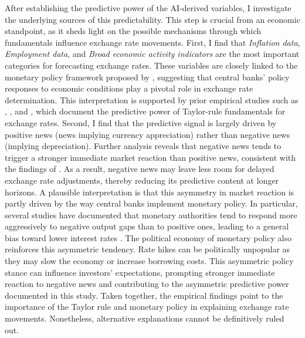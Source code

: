 \documentclass[12pt,oneside,letter]{article}
\begin{document}
	After establishing the predictive power of the AI-derived variables, I investigate the underlying sources of this predictability. This step is crucial from an economic standpoint, as it sheds light on the possible mechanisms through which fundamentals influence exchange rate movements. First, I find that \textit{Inflation data}, \textit{Employment data}, and \textit{Broad economic activity indicators} are the most important categories for forecasting exchange rates. These variables are closely linked to the monetary policy framework proposed by \citet{TAYLOR:1993}, suggesting that central banks' policy responses to economic conditions play a pivotal role in exchange rate determination. This interpretation is supported by prior empirical studies such as \citet{CLARIDA/WALDMAN:2007}, \citet{MOLODTSOVA/PAPELL:2009}, and \citet{ENGLE/WU:2024}, which document the predictive power of Taylor-rule fundamentals for exchange rates. Second, I find that the predictive signal is largely driven by positive news (news implying currency appreciation) rather than negative news (implying depreciation). Further analysis reveals that negative news tends to trigger a stronger immediate market reaction than positive news, consistent with the findings of \citet{ANDERSEN/ETAL:2003}. As a result, negative news may leave less room for delayed exchange rate adjustments, thereby reducing its predictive content at longer horizons. A plausible interpretation is that this asymmetry in market reaction is partly driven by the way central banks implement monetary policy. In particular, several studies have documented that monetary authorities tend to respond more aggressively to negative output gaps than to positive ones, leading to a general bias toward lower interest rates \citep{DOLADO/ETAL:2004, BRUGGEMANN/RIEDEL:2011, HOFMANN/BOGDANOVA:2012, KOMLAN:2013}. The political economy of monetary policy also reinforces this asymmetric tendency. Rate hikes can be politically unpopular as they may slow the economy or increase borrowing costs. This asymmetric policy stance can influence investors' expectations, prompting stronger immediate reaction to negative news and contributing to the asymmetric predictive power documented in this study. Taken together, the empirical findings point to the importance of the Taylor rule and monetary policy in explaining exchange rate movements. Nonetheless, alternative explanations cannot be definitively ruled out.\newline
\end{document}
